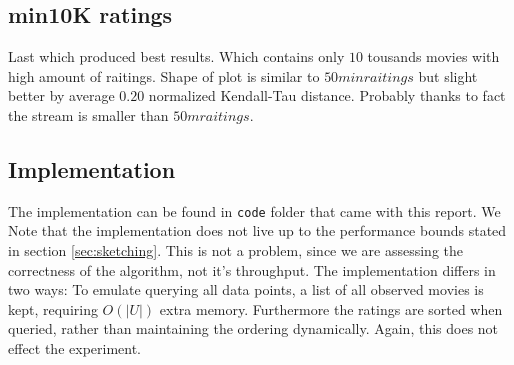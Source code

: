 \subsection{min10K ratings}
Last which produced best results. Which contains only $10$ tousands movies with high amount of raitings. Shape of plot is similar to 
$50min raitings$ but slight better by average $0.20$ normalized Kendall-Tau distance. Probably thanks to fact the stream is smaller than
$50m raitings$. 

\subsection{Implementation}
The implementation can be found in \texttt{code} folder that came with this
report. We Note that the implementation does not live up to the performance
bounds stated in section \ref{sec:sketching}. This is not a problem, since we
are assessing the correctness of the algorithm, not it's throughput. The
implementation differs in two ways: To emulate querying all data points, a list
of all observed movies is kept, requiring $O(|U|)$ extra memory. Furthermore the
ratings are sorted when queried, rather than maintaining the ordering
dynamically. Again, this does not effect the experiment.
